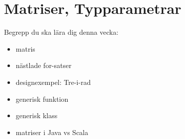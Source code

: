 \chapter{Matriser, Typparametrar}\label{chapter:W09}
Begrepp du ska lära dig denna vecka:
\begin{multicols}{2}\begin{itemize}[nosep,label={$\square$},leftmargin=*]
\item matris
\item nästlade for-satser
\item designexempel: Tre-i-rad
\item generisk funktion
\item generisk klass
\item matriser i Java vs Scala\end{itemize}\end{multicols}
